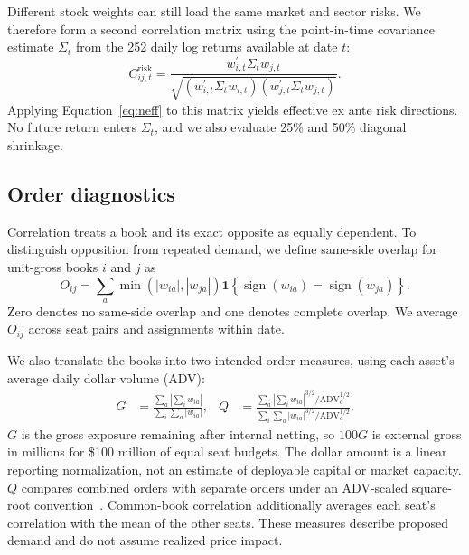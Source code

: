 \documentclass[sigconf]{acmart}
\begin{document}
Different stock weights can still load the same market and sector risks. We therefore form a second correlation matrix using the point-in-time covariance estimate $\Sigma_t$ from the 252 daily log returns available at date $t$:
\begin{equation}
C^{\mathrm{risk}}_{ij,t}=\frac{w_{i,t}^{\prime}\Sigma_t w_{j,t}}
{\sqrt{(w_{i,t}^{\prime}\Sigma_t w_{i,t})(w_{j,t}^{\prime}\Sigma_t w_{j,t})}}.
\label{eq:riskcorr}
\end{equation}
Applying Equation~\eqref{eq:neff} to this matrix yields effective ex ante risk directions. No future return enters $\Sigma_t$, and we also evaluate 25\% and 50\% diagonal shrinkage.

\subsection{Order diagnostics}
Correlation treats a book and its exact opposite as equally dependent. To distinguish opposition from repeated demand, we define same-side overlap for unit-gross books $i$ and $j$ as
\begin{equation}
O_{ij}=\sum_a \min(|w_{ia}|,|w_{ja}|)
\mathbf{1}\!\left\{\operatorname{sign}(w_{ia})=\operatorname{sign}(w_{ja})\right\}.
\label{eq:overlap}
\end{equation}
Zero denotes no same-side overlap and one denotes complete overlap. We average $O_{ij}$ across seat pairs and assignments within date.

We also translate the books into two intended-order measures, using each asset's average daily dollar volume (ADV):
\begin{equation}
\begin{aligned}
G&=\frac{\sum_a |\sum_i w_{ia}|}{\sum_i\sum_a |w_{ia}|}, &
Q&=\frac{\sum_a |\sum_i w_{ia}|^{3/2}/\mathrm{ADV}_a^{1/2}}
{\sum_i\sum_a |w_{ia}|^{3/2}/\mathrm{ADV}_a^{1/2}}.
\end{aligned}
\label{eq:orders}
\end{equation}
$G$ is the gross exposure remaining after internal netting, so $100G$ is external gross in millions for \$100 million of equal seat budgets. The dollar amount is a linear reporting normalization, not an estimate of deployable capital or market capacity. $Q$ compares combined orders with separate orders under an ADV-scaled square-root convention~\cite{bucci2020coimpact}. Common-book correlation additionally averages each seat's correlation with the mean of the other seats. These measures describe proposed demand and do not assume realized price impact.
\end{document}
